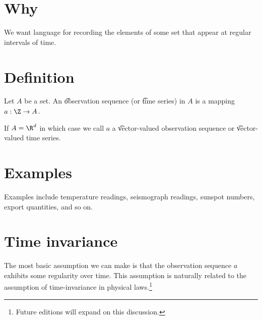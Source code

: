 

\section*{Why}

We want language for recording the elements of some set that appear at regular intervals of time.

\section*{Definition}

Let $A$ be a set.
An \t{observation sequence} (or \t{time series}) in $A$ is a mapping $a: \Z  \to A$.

If $A = \R ^d$ in which case we call $a$ a \t{vector-valued observation sequence} or \t{vector-valued time series}.

\section*{Examples}

Examples include temperature readings, seismograph readings, sunspot numbers, export quantities, and so on.

\section*{Time invariance}

The most basic assumption we can make is that the observation sequence $a$ exhibits some regularity over time.
This assumption is naturally related to the assumption of time-invariance in physical laws.\footnote{Future editions will expand on this discussion.}

\blankpage